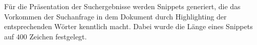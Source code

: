 Für die Präsentation der Suchergebnisse werden Snippets generiert, die das Vorkommen der Suchanfrage in dem Dokument durch Highlighting der entsprechenden Wörter kenntlich macht. Dabei wurde die Länge eines Snippets auf $400$ Zeichen festgelegt. 
